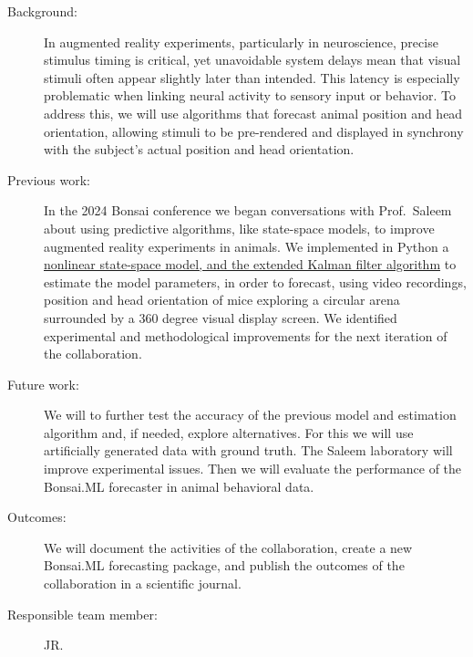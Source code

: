 \begin{description}

    \item[Background:] In augmented reality experiments, particularly in
        neuroscience, precise stimulus timing is critical, yet unavoidable
        system delays mean that visual stimuli often appear slightly later than
        intended. This latency is especially problematic when linking neural
        activity to sensory input or behavior. To address this, we will use
        algorithms that forecast animal position and head orientation, allowing
        stimuli to be pre-rendered and displayed in synchrony with the
        subject's actual position and head orientation.

    \item[Previous work:] In the 2024 Bonsai conference we began conversations
        with Prof.~Saleem about using predictive algorithms, like state-space
        models, to improve augmented reality experiments in animals. We
        implemented in Python a
        \href{https://github.com/joacorapela/collaborationAman/blob/master/reports/ekfForKinematicsAndHeadOrientation/ekfForKinematicsAndHeadOrientation.pdf}{
            nonlinear state-space model, and the extended Kalman filter
            algorithm} to estimate the model parameters, in order to forecast,
        using video recordings, position and head orientation of mice exploring
        a circular arena surrounded by a 360 degree visual display screen. We identified
        experimental and methodological improvements for the next iteration of
        the collaboration.

    \item[Future work:] We will to further test the accuracy of the previous
        model and estimation algorithm and, if needed, explore alternatives. For
        this we will use artificially generated data with ground truth. The
        Saleem laboratory will improve experimental issues. Then we
        will evaluate the performance of the Bonsai.ML forecaster in animal
        behavioral data.

    \item[Outcomes:] We will document the activities of the collaboration, create a new
        Bonsai.ML forecasting package, and publish the outcomes of the
        collaboration in a scientific journal.

    \item[Responsible team member:] JR.

\end{description}

